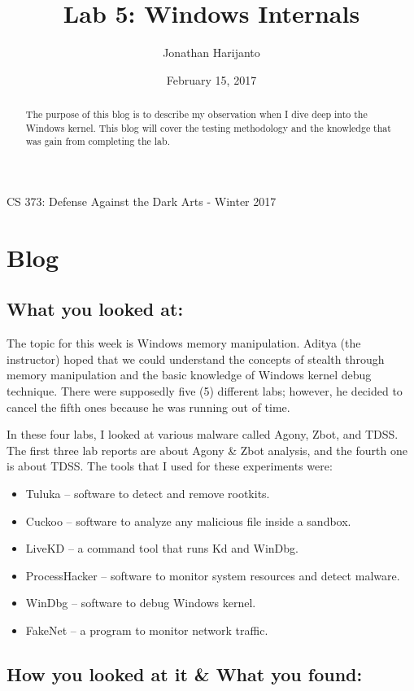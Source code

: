 \documentclass[letterpaper,10pt,titlepage,draftclsnofoot,onecolumn]{IEEEtran}
\title{Lab 5: Windows Internals}
\author{Jonathan Harijanto}
\date{February 15, 2017}
\begin{document}
\maketitle
\begin{center}
CS 373: Defense Against the Dark Arts - Winter 2017
\vfill
\end{center}
\begin{abstract}
The purpose of this blog is to describe my observation when I dive deep into the Windows kernel.
This blog will cover the testing methodology and the knowledge that was gain from completing the lab.

\end{abstract}
\newpage

\section{Blog} 

\subsection{What you looked at:}

The topic for this week is Windows memory manipulation. 
Aditya (the instructor) hoped that we could understand the concepts of stealth through memory manipulation and the basic knowledge of Windows kernel debug technique.
There were supposedly five (5) different labs; however, he decided to cancel the fifth ones because he was running out of time.

In these four labs, I looked at various malware called Agony, Zbot, and TDSS.
The first three lab reports are about Agony \& Zbot analysis, and the fourth one is about TDSS.
The tools that I used for these experiments were: 
\begin{itemize}
    \item Tuluka -- software to detect and remove rootkits.
    \item Cuckoo -- software to analyze any malicious file inside a sandbox.
    \item LiveKD -- a command tool that runs Kd and WinDbg.
    \item ProcessHacker -- software to monitor system resources and detect malware.
    \item WinDbg -- software to debug Windows kernel.
    \item FakeNet -- a program to monitor network traffic.
\end{itemize}

\subsection{How you looked at it \& What you found:}
\end{document}
